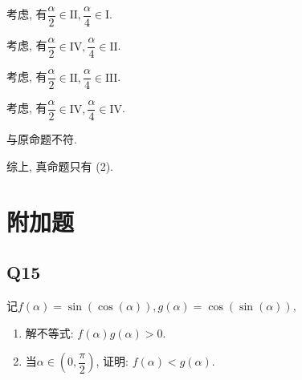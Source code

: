\documentclass[8pt]{article}
\begin{document}
\begin{enumerate}[label=(\arabic*)]
					考虑, 有$\dfrac{\alpha}{2} \in \mathrm{II}, \dfrac{\alpha}{4} \in \mathrm{I}$.

					考虑, 有$\dfrac{\alpha}{2} \in \mathrm{IV}, \dfrac{\alpha}{4} \in \mathrm{II}$.

					考虑, 有$\dfrac{\alpha}{2} \in \mathrm{II}, \dfrac{\alpha}{4} \in \mathrm{III}$.

					考虑, 有$\dfrac{\alpha}{2} \in \mathrm{IV}, \dfrac{\alpha}{4} \in \mathrm{IV}$.

					与原命题不符.

			\end{enumerate}

			综上, 真命题只有 (2).

	\section{附加题}
		\subsection{Q15}
			 记$f(\alpha)=\sin(\cos(\alpha)), g(\alpha)=\cos(\sin(\alpha)),$

			\begin{enumerate}[label=(\arabic*)]
				\item 解不等式: $f(\alpha)g(\alpha)>0$.
				\item 当$\alpha\in\left(0, \dfrac{\pi}{2}\right)$, 证明: $f(\alpha)<g(\alpha)$.
			\end{enumerate}
			~\\
\end{document}
